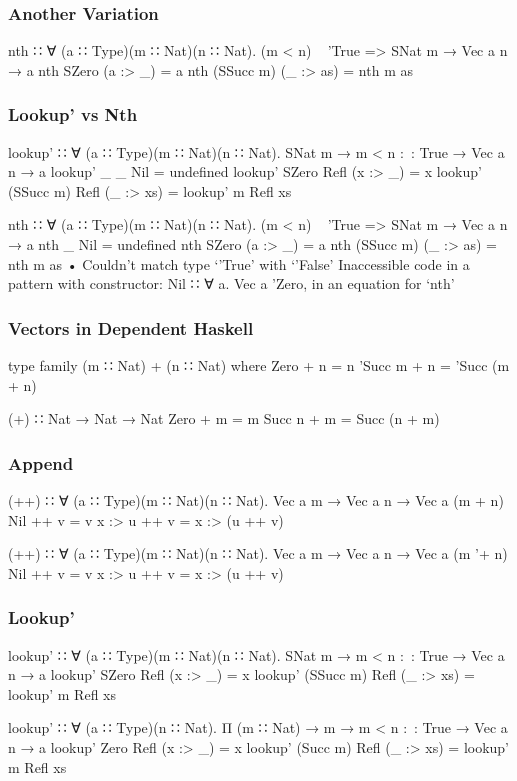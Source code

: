 \documentclass{beamer}
\begin{document}
\begin{frame}[fragile]\frametitle{Another Variation}
\begin{semiverbatim}
nth ∷ ∀ (a ∷ Type)(m ∷ Nat)(n ∷ Nat).
       (m < n) ~ 'True => SNat m → Vec a n → a
nth SZero     (a :> _)  = a
nth (SSucc m) (_ :> as) = nth m as
\end{semiverbatim}
\end{frame}

\begin{frame}[fragile]\frametitle{Lookup' vs Nth}
\begin{semiverbatim}
lookup' ∷ ∀ (a ∷ Type)(m ∷ Nat)(n ∷ Nat).
           SNat m → m < n :~: True → Vec a n → a
lookup' _         _    Nil       = undefined
lookup' SZero     Refl (x :> _)  = x
lookup' (SSucc m) Refl (_ :> xs) = lookup' m Refl xs

nth ∷ ∀ (a ∷ Type)(m ∷ Nat)(n ∷ Nat).
       (m < n) ~ 'True => SNat m → Vec a n → a
nth _         Nil       =  undefined
nth SZero     (a :> _)  = a
nth (SSucc m) (_ :> as) = nth m as
• Couldn't match type ‘'True’ with ‘'False’
  Inaccessible code in
    a pattern with constructor: Nil ∷ ∀ a. Vec a 'Zero,
    in an equation for ‘nth’
\end{semiverbatim}
\end{frame}

\begin{frame}[fragile]\frametitle{Vectors in Dependent Haskell}
\begin{semiverbatim}
type family (m ∷ Nat) + (n ∷ Nat) where
  Zero    + n = n
  'Succ m + n = 'Succ (m + n)

(+) ∷ Nat → Nat → Nat
Zero   + m = m
Succ n + m = Succ (n + m)
\end{semiverbatim}
\end{frame}

\begin{frame}[fragile]\frametitle{Append}
\begin{semiverbatim}
(++) ∷ ∀ (a ∷ Type)(m ∷ Nat)(n ∷ Nat).
        Vec a m → Vec a n → Vec a (m + n)
Nil    ++ v = v
x :> u ++ v = x :> (u ++ v)

(++) ∷ ∀ (a ∷ Type)(m ∷ Nat)(n ∷ Nat).
        Vec a m → Vec a n → Vec a (m '+ n)
Nil    ++ v = v
x :> u ++ v = x :> (u ++ v)
\end{semiverbatim}
\end{frame}

\begin{frame}[fragile]\frametitle{Lookup'}
\begin{semiverbatim}
lookup' ∷ ∀ (a ∷ Type)(m ∷ Nat)(n ∷ Nat).
           SNat m → m < n :~: True → Vec a n → a
lookup' SZero     Refl (x :> _)  = x
lookup' (SSucc m) Refl (_ :> xs) = lookup' m Refl xs

lookup' ∷ ∀ (a ∷ Type)(n ∷ Nat). Π (m ∷ Nat) →
           m → m < n :~: True → Vec a n → a
lookup' Zero     Refl (x :> _)  = x
lookup' (Succ m) Refl (_ :> xs) = lookup' m Refl xs
\end{semiverbatim}
\end{frame}
\end{document}
